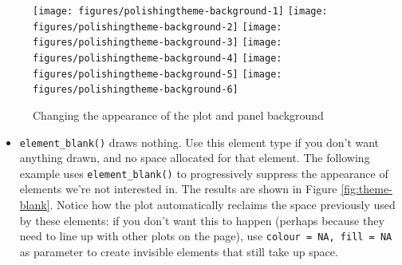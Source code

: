 \begin{Shaded}
\begin{Highlighting}[]
\StringTok{ }\NormalTok{(} \NormalTok{(} \NormalTok{, } \NormalTok{))}
\StringTok{ }\NormalTok{(} \NormalTok{(} \NormalTok{))}
\StringTok{ }\NormalTok{(} \NormalTok{(} \NormalTok{))}
\StringTok{ }\NormalTok{(} \NormalTok{())}
\StringTok{ }\NormalTok{(} \NormalTok{(} \NormalTok{))}
\StringTok{ }\NormalTok{(} \NormalTok{(} \NormalTok{))}
\end{Highlighting}
\end{Shaded}

\begin{figure}

{\centering \texttt{[image: figures/polishingtheme-background-1]} \texttt{[image: figures/polishingtheme-background-2]} \texttt{[image: figures/polishingtheme-background-3]} \texttt{[image: figures/polishingtheme-background-4]} \texttt{[image: figures/polishingtheme-background-5]} \texttt{[image: figures/polishingtheme-background-6]} 

}

\caption{Changing the appearance of the plot and panel background\label{fig:theme-background}}
\end{figure}

\begin{itemize}
\itemsep1pt\parskip0pt
\item
  \texttt{element\_blank()} draws nothing. Use this element type if you
  don't want anything drawn, and no space allocated for that element.
  The following example uses \texttt{element\_blank()} to progressively
  suppress the appearance of elements we're not interested in. The
  results are shown in Figure \ref{fig:theme-blank}. Notice how the plot
  automatically reclaims the space previously used by these elements: if
  you don't want this to happen (perhaps because they need to line up
  with other plots on the page), use \texttt{colour = NA, fill = NA} as
  parameter to create invisible elements that still take up space.
\end{itemize}

